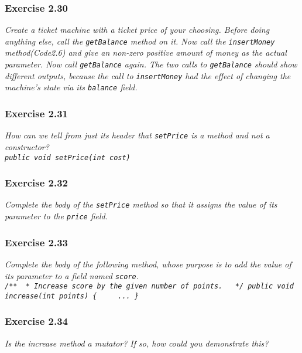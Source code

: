 \subsubsection*{Exercise 2.30}
\textit{Create a ticket machine with a ticket price of your choosing. Before 
doing anything else, call the \lstinline?getBalance? method on it. Now call the 
\lstinline?insertMoney? method(Code2.6) and give an non-zero positive amount of 
money as the actual parameter. Now call \lstinline?getBalance? again. The two 
calls to \lstinline?getBalance? should show different outputs, because the call 
to \lstinline?insertMoney? had the effect of changing the machine's state via 
its \lstinline?balance? field. }\\

\subsubsection*{Exercise 2.31}
\textit{How can we tell from just its header that \lstinline?setPrice? is a 
method and not a constructor? \\
\lstinline?public void setPrice(int cost)?}\\

\subsubsection*{Exercise 2.32}
\textit{Complete the body of the \lstinline?setPrice? method so that it 
assigns the value of its parameter to the \lstinline?price? field. }\\

\subsubsection*{Exercise 2.33}
\textit{Complete the body of the following method, whose purpose is to add the 
value of its parameter to a field named \lstinline?score?. \\
\lstinline?/**
 * Increase score by the given number of points. 
 */
public void increase(int points)
{
    ...
}?}\\

\subsubsection*{Exercise 2.34}
\textit{Is the increase method a mutator? If so, how could you demonstrate 
this? }\\

